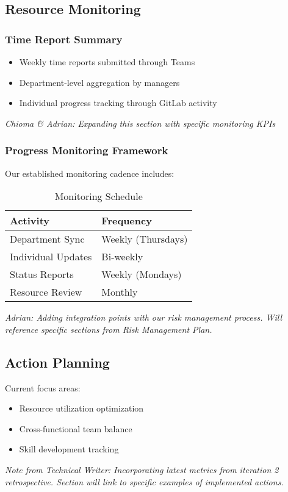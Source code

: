 \subsection{Resource Monitoring}
\subsubsection{Time Report Summary}

\begin{itemize}
    \item Weekly time reports submitted through Teams
    \item Department-level aggregation by managers
    \item Individual progress tracking through GitLab activity
\end{itemize}

\textit{Chioma & Adrian: Expanding this section with specific monitoring KPIs}

\subsubsection{Progress Monitoring Framework}
Our established monitoring cadence includes:

\begin{table}[H]
\begin{tabularx}{\textwidth}{>{\raggedright\arraybackslash}X>{\raggedright\arraybackslash}X}
\toprule
\textbf{Activity} & \textbf{Frequency} \\
\midrule
Department Sync & Weekly (Thursdays) \\
Individual Updates & Bi-weekly \\
Status Reports & Weekly (Mondays) \\
Resource Review & Monthly \\
\bottomrule
\end{tabularx}
\caption{Monitoring Schedule}
\label{tab:monitoring-schedule}
\end{table}

\textit{Adrian: Adding integration points with our risk management process. Will reference specific sections from Risk Management Plan.}

\subsection{Action Planning}
Current focus areas:
\begin{itemize}
    \item Resource utilization optimization
    \item Cross-functional team balance
    \item Skill development tracking
\end{itemize}

\textit{Note from Technical Writer: Incorporating latest metrics from iteration 2 retrospective. Section will link to specific examples of implemented actions.}
